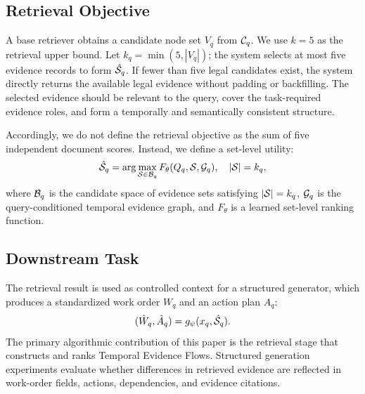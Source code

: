 \subsection{Retrieval Objective}

A base retriever obtains a candidate node set $V_q$ from $\mathcal{C}_q$. We use $k=5$ as the retrieval upper bound. Let $k_q=\min(5,|V_q|)$; the system selects at most five evidence records to form $\hat{\mathcal{S}}_q$. If fewer than five legal candidates exist, the system directly returns the available legal evidence without padding or backfilling. The selected evidence should be relevant to the query, cover the task-required evidence roles, and form a temporally and semantically consistent structure.

Accordingly, we do not define the retrieval objective as the sum of five independent document scores. Instead, we define a set-level utility:
\begin{equation}
\hat{\mathcal{S}}_q
=
\arg\max_{\mathcal{S}\in\mathcal{B}_q}
F_{\theta}(Q_q,\mathcal{S},\mathcal{G}_q),
\quad |\mathcal{S}|=k_q,
\label{eq:set_selection}
\end{equation}
where $\mathcal{B}_q$ is the candidate space of evidence sets satisfying $|\mathcal{S}|=k_q$, $\mathcal{G}_q$ is the query-conditioned temporal evidence graph, and $F_{\theta}$ is a learned set-level ranking function.

\subsection{Downstream Task}

The retrieval result is used as controlled context for a structured generator, which produces a standardized work order $W_q$ and an action plan $A_q$:
\begin{equation}
(\hat W_q,\hat A_q)=g_{\psi}(x_q,\hat{\mathcal{S}}_q).
\label{eq:downstream_generation}
\end{equation}
The primary algorithmic contribution of this paper is the retrieval stage that constructs and ranks Temporal Evidence Flows. Structured generation experiments evaluate whether differences in retrieved evidence are reflected in work-order fields, actions, dependencies, and evidence citations.

